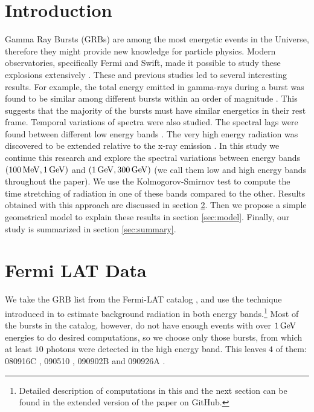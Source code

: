 \documentclass[11pt,a4paper]{article}
\begin{document}
\section{Introduction}
Gamma Ray Bursts (GRBs) are among the most energetic events in the Universe, therefore they might provide new knowledge for particle physics.
Modern observatories, specifically Fermi \cite{Ackermann:2012kna} and Swift, \cite{Gehrels:2004gu} made it possible to study these explosions extensively \cite{Vianello:2013ela,Gehrels:2013xd}.
These and previous studies led to several interesting results.
For example, the total energy emitted in gamma-rays during a burst was found to be similar among different bursts within an order of magnitude \cite{Bloom:2003wy}.
This suggests that the majority of the bursts must have similar energetics in their rest frame.
Temporal variations of spectra were also studied.
The spectral lags were found between different low energy bands \cite{Yi:2005ht}.
The very high energy radiation was discovered to be extended relative to the x-ray emission \cite{Castignani:2014gaa,Lange:2013uh,Vianello:2013ela}.
In this study we continue this research and explore the spectral variations between energy bands $(\unit[100]{MeV}, \unit[1]{GeV})$ and $(\unit[1]{GeV}, \unit[300]{GeV})$ (we call them low and high energy bands throughout the paper).
We use the Kolmogorov-Smirnov test to compute the time stretching of radiation in one of these bands compared to the other.
Results obtained with this approach are discussed in section \ref{sec:data}.
Then we propose a simple geometrical model to explain these results in section \ref{sec:model}.
Finally, our study is summarized in section \ref{sec:summary}.

\section{Fermi LAT Data}
\label{sec:data}

We take the GRB list from the Fermi-LAT catalog \cite{Ackermann:2013zfa}, and use the technique introduced in \cite{Rubtsov:2011qq} to estimate background radiation in both energy bands.\footnote{Detailed description of computations in this and the next section can be found in the extended version of the paper on GitHub.}
Most of the bursts in the catalog, however, do not have enough events with over $\unit[1]{GeV}$ energies to do desired computations, so we choose only those bursts, from which at least $10$ photons were detected in the high energy band.
This leaves $4$ of them: 080916C \cite{Tajima:2009az}, 090510 \cite{Ackermann:2010us}, 090902B \cite{Abdo:2009pg} and 090926A \cite{Bregeon:2011bu}.
\end{document}
